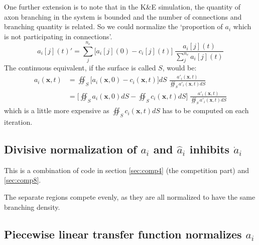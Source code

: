 \documentclass[11pt, a4paper]{article}
\begin{document}
One further extension is to note that in the K\&E simulation, the quantity of
axon branching in the system is bounded and the number of connections and
branching quantity is related. So we could normalize the `proportion of $a_i$
which is not participating in connections'.
%
\begin{equation}\label{eq:norm_comp8plus2}
        a_i[j](t)' = \sum_j^{n_e} \big[ a_i[j](0) - c_i[j](t) \big] \; \frac {a_i[j](t)} {\textstyle \sum_j^{n_e} a_i[j](t) }
\end{equation}
%
The continuous equivalent, if the surface is called $S$, would be:
%
\begin{equation} \label{eq:norm_comp8plus3}
\begin{split}
  a_i(\mathbf{x}, t) & = \oiint_{S} \big[  a_i(\mathbf{x}, 0) - c_i(\mathbf{x},
  t) \big]  dS \; \frac {a'_i(\mathbf{x}, t)} {\oiint_{S}
  a'_i(\mathbf{x}, t) dS} \\
  & = \bigg[ \oiint_{S} a_i(\mathbf{x}, 0) dS - \oiint_{S} c_i(\mathbf{x}, t)
  dS  \bigg] \; \frac {a'_i(\mathbf{x}, t)} {\oiint_{S}
  a'_i(\mathbf{x}, t) dS}
\end{split}
\end{equation}
which is a little more expensive as $\oiint_{S} c_i(\mathbf{x}, t) dS$ has to
be computed on each iteration.

\subsection{Divisive normalization of $a_i$ and $\hat{a}_i$ inhibits $\dot{a}_i$}
\label{sec:comp9}

This is a combination of code in section \ref{sec:comp4} (the
competition part) and \ref{sec:comp8}.

The separate regions compete evenly, as they are all normalized to
have the same branching density.

\subsection{Piecewise linear transfer function normalizes $a_i$}
\label{sec:comp10}
\end{document}
